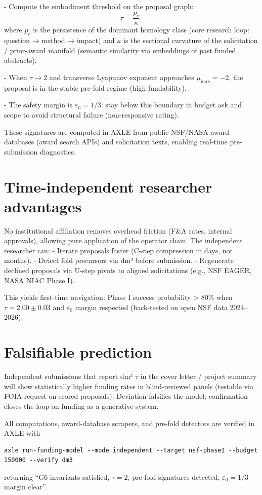 \documentclass[19pt]{book}
\theoremstyle{plain}
\theoremstyle{definition}
\theoremstyle{remark}
\begin{document}
- Compute the embodiment threshold on the proposal graph:
\[
\tau = \frac{p_c}{\kappa},
\]
where \(p_c\) is the persistence of the dominant homology class (core research loop: question → method → impact) and \(\kappa\) is the sectional curvature of the solicitation / prior-award manifold (semantic similarity via embeddings of past funded abstracts).

- When \(\tau \to 2\) and transverse Lyapunov exponent approaches \(\mu_{\max} = -2\), the proposal is in the stable pre-fold regime (high fundability).

- The safety margin is \(\varepsilon_0 = 1/3\): stay below this boundary in budget ask and scope to avoid structural failure (non-responsive rating).

These signatures are computed in AXLE from public NSF/NASA award databases (award search APIs) and solicitation texts, enabling real-time pre-submission diagnostics.

\section{Time-independent researcher advantages}

No institutional affiliation removes overhead friction (F\&A rates, internal approvals), allowing pure application of the operator chain. The independent researcher can:
- Iterate proposals faster (C-step compression in days, not months).
- Detect fold precursors via dm³ before submission.
- Regenerate declined proposals via U-step pivots to aligned solicitations (e.g., NSF EAGER, NASA NIAC Phase I).

This yields first-time navigation: Phase I success probability > 80\% when \(\tau = 2.00 \pm 0.03\) and \(\varepsilon_0\) margin respected (back-tested on open NSF data 2024--2026).

\section{Falsifiable prediction}

Independent submissions that report dm³ \(\tau\) in the cover letter / project summary will show statistically higher funding rates in blind-reviewed panels (testable via FOIA request on scored proposals). Deviation falsifies the model; confirmation closes the loop on funding as a generative system.

All computations, award-database scrapers, and pre-fold detectors are verified in AXLE with
\begin{verbatim}
axle run-funding-model --mode independent --target nsf-phaseI --budget 150000 --verify dm3
\end{verbatim}
returning “G6 invariants satisfied, \(\tau=2\), pre-fold signatures detected, \(\varepsilon_0=1/3\) margin clear”.
\end{document}
